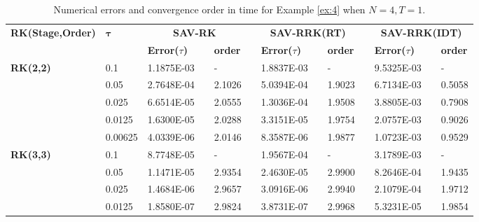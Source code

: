 \documentclass[preprint,compress,3p,10pt,fleqn]{elsarticle}
\numberwithin{equation}{section}
\begin{document}
\begin{table}[H]\footnotesize
\centering
\caption{Numerical errors and convergence order in time for Example \ref{ex:4} when $N=4, T = 1$.}
\begin{tabular}{lllllrlrlrlrlrl}
\toprule
\multicolumn{2}{l}{\multirow{2}[3]{*}{\textbf{RK(Stage,Order)}}} & \multicolumn{2}{l}{\multirow{2}[3]{*}{$\bm{\tau}$}} & \multicolumn{3}{c}{\textbf{SAV-RK}} &       & \multicolumn{3}{c}{\textbf{SAV-RRK(RT)}} &       & \multicolumn{3}{c}{\textbf{SAV-RRK(IDT)}} \\
\cmidrule{5-7}\cmidrule{9-11}\cmidrule{13-15}    \multicolumn{2}{l}{} & \multicolumn{2}{l}{} & \textbf{Error($\tau$)} &       & \textbf{order} &       & \textbf{Error($\tau$)} &       & \textbf{order} &       & \textbf{Error($\tau$)} &       & \textbf{order} \\
\hline
\multicolumn{2}{l}{\multirow{5}[0]{*}{\textbf{RK(2,2)}}} & \multicolumn{2}{l}{0.1} & 1.1875E-03 &       & -     &       & 1.8837E-03 &       & -     &       & 9.5325E-03 &       & - \\
\multicolumn{2}{l}{} & \multicolumn{2}{l}{0.05} & 2.7648E-04 &       & 2.1026  &       & 5.0394E-04 &       & 1.9023  &       & 6.7134E-03 &       & 0.5058  \\
\multicolumn{2}{l}{} & \multicolumn{2}{l}{0.025} & 6.6514E-05 &       & 2.0555  &       & 1.3036E-04 &       & 1.9508  &       & 3.8805E-03 &       & 0.7908  \\
\multicolumn{2}{l}{} & \multicolumn{2}{l}{0.0125} & 1.6300E-05 &       & 2.0288  &       & 3.3151E-05 &       & 1.9754  &       & 2.0757E-03 &       & 0.9026  \\
\multicolumn{2}{l}{} & \multicolumn{2}{l}{0.00625} & 4.0339E-06 &       & 2.0146  &       & 8.3587E-06 &       & 1.9877  &       & 1.0723E-03 &       & 0.9529  \\
\multicolumn{2}{l}{\multirow{5}[0]{*}{\textbf{RK(3,3)}}} & \multicolumn{2}{l}{0.1} & 8.7748E-05 &       & -     &       & 1.9567E-04 &       & -     &       & 3.1789E-03 &       & - \\
\multicolumn{2}{l}{} & \multicolumn{2}{l}{0.05} & 1.1471E-05 &       & 2.9354  &       & 2.4630E-05 &       & 2.9900  &       & 8.2646E-04 &       & 1.9435  \\
\multicolumn{2}{l}{} & \multicolumn{2}{l}{0.025} & 1.4684E-06 &       & 2.9657  &       & 3.0916E-06 &       & 2.9940  &       & 2.1079E-04 &       & 1.9712  \\
\multicolumn{2}{l}{} & \multicolumn{2}{l}{0.0125} & 1.8580E-07 &       & 2.9824  &       & 3.8731E-07 &       & 2.9968  &       & 5.3231E-05 &       & 1.9854  \\

\end{tabular}
\end{table}
\end{document}
